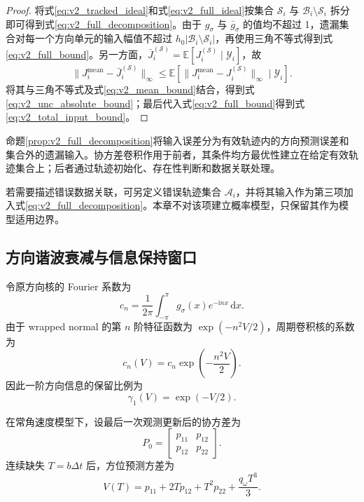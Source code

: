 \documentclass[UTF8,fontset=windows,11pt]{ctexart}
\newcommand{\E}{\mathbb E}
\begin{document}
\begin{proof}
将式\eqref{eq:v2_tracked_ideal}和式\eqref{eq:v2_full_ideal}按集合 $\mathcal S_i$ 与 $\mathcal B_i\setminus\mathcal S_i$ 拆分即可得到式\eqref{eq:v2_full_decomposition}。由于 $g_\sigma$ 与 $\bar g_\sigma$ 的值均不超过 1，遗漏集合对每一个方向单元的输入幅值不超过 $h_0|\mathcal B_i\setminus\mathcal S_i|$，再使用三角不等式得到式\eqref{eq:v2_full_bound}。另一方面，$\bar J_i^{(\mathcal S)}=\E[J_i^{(\mathcal S)}\mid\mathcal Y_i]$，故
\[
 \|J_i^{\mathrm{mean}}-\bar J_i^{(\mathcal S)}\|_\infty
 \le\E[\|J_i^{\mathrm{mean}}-J_i^{(\mathcal S)}\|_\infty\mid\mathcal Y_i].
\]
将其与三角不等式及式\eqref{eq:v2_mean_bound}结合，得到式\eqref{eq:v2_unc_absolute_bound}；最后代入式\eqref{eq:v2_full_bound}得到式\eqref{eq:v2_total_input_bound}。
\end{proof}

命题\ref{prop:v2_full_decomposition}将输入误差分为有效轨迹内的方向预测误差和集合外的遗漏输入。协方差卷积作用于前者，其条件均方最优性建立在给定有效轨迹集合上；后者通过轨迹初始化、存在性判断和数据关联处理。

若需要描述错误数据关联，可另定义错误轨迹集合 $\mathcal A_i$，并将其输入作为第三项加入式\eqref{eq:v2_full_decomposition}。本章不对该项建立概率模型，只保留其作为模型适用边界。

\subsection{方向谐波衰减与信息保持窗口}

令原方向核的 Fourier 系数为
\begin{equation}
 c_n=\frac{1}{2\pi}\int_{-\pi}^{\pi}g_\sigma(x)e^{-\mathrm inx}\,\mathrm dx .
 \label{eq:v2_fourier_coeff}
\end{equation}
由于 wrapped normal 的第 $n$ 阶特征函数为 $\exp(-n^2V/2)$，周期卷积核的系数为
\begin{equation}
 c_n(V)=c_n\exp\left(-\frac{n^2V}{2}\right).
 \label{eq:v2_harmonic_decay}
\end{equation}
因此一阶方向信息的保留比例为
\begin{equation}
 \gamma_1(V)=\exp(-V/2).
 \label{eq:v2_first_harmonic}
\end{equation}

在常角速度模型下，设最后一次观测更新后的协方差为
\begin{equation}
 P_0=\begin{bmatrix}p_{11}&p_{12}\\p_{12}&p_{22}\end{bmatrix}.
 \label{eq:v2_p0}
\end{equation}
连续缺失 $T=b\Delta t$ 后，方位预测方差为
\begin{equation}
 V(T)=p_{11}+2Tp_{12}+T^2p_{22}+\frac{q_\omega T^3}{3}.
 \label{eq:v2_vt}
\end{equation}
\end{document}
